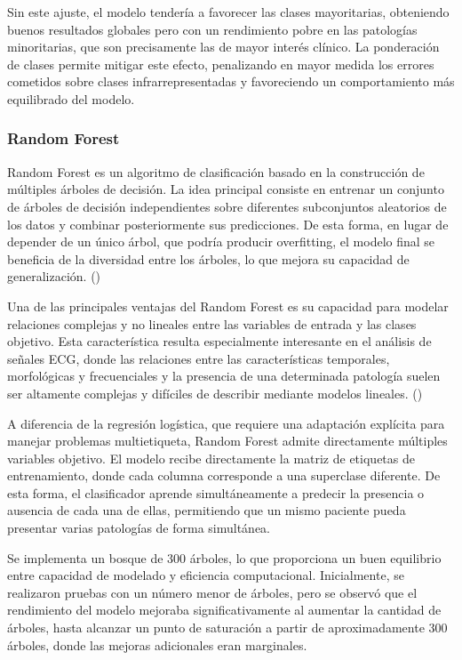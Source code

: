 \documentclass[12pt,a4paper,twoside]{book}
\begin{document}
Sin este ajuste, el modelo tendería a favorecer las clases mayoritarias, obteniendo buenos resultados globales pero con un rendimiento pobre en las patologías minoritarias, que son precisamente las de mayor interés clínico. 
La ponderación de clases permite mitigar este efecto, penalizando en mayor medida los errores cometidos sobre clases infrarrepresentadas y favoreciendo un comportamiento más equilibrado del modelo.

\subsubsection*{Random Forest}

Random Forest es un algoritmo de clasificación basado en la construcción de múltiples árboles de decisión.
La idea principal consiste en entrenar un conjunto de árboles de decisión independientes sobre diferentes subconjuntos aleatorios de los datos y combinar posteriormente sus predicciones.
De esta forma, en lugar de depender de un único árbol, que podría producir overfitting, el modelo final se beneficia de la diversidad entre los árboles, lo que mejora su capacidad de generalización. (\cite{ibm_random_forest})

Una de las principales ventajas del Random Forest es su capacidad para modelar relaciones complejas y no lineales entre las variables de entrada y las clases objetivo. 
Esta característica resulta especialmente interesante en el análisis de señales ECG, donde las relaciones entre las características temporales, morfológicas y frecuenciales y la presencia de una determinada patología suelen ser altamente complejas y difíciles de describir mediante modelos lineales. (\cite{zou2022heartbeat_rf})

A diferencia de la regresión logística, que requiere una adaptación explícita para manejar problemas multietiqueta, Random Forest admite directamente múltiples variables objetivo.
El modelo recibe directamente la matriz de etiquetas de entrenamiento, donde cada columna corresponde a una superclase diferente.
De esta forma, el clasificador aprende simultáneamente a predecir la presencia o ausencia de cada una de ellas, permitiendo que un mismo paciente pueda presentar varias patologías de forma simultánea.

Se implementa un bosque de 300 árboles, lo que proporciona un buen equilibrio entre capacidad de modelado y eficiencia computacional. 
Inicialmente, se realizaron pruebas con un número menor de árboles, pero se observó que el rendimiento del modelo mejoraba significativamente al aumentar la cantidad de árboles, hasta alcanzar un punto de saturación a partir de aproximadamente 300 árboles, donde las mejoras adicionales eran marginales.
\end{document}
